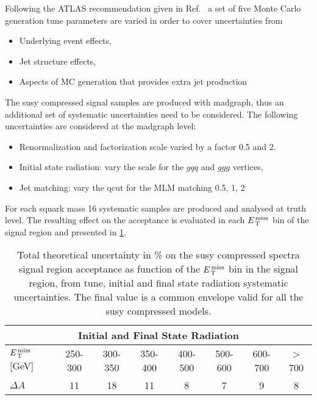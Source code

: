 Following the ATLAS recommendation given in
Ref.~\cite{MCTuningRecommendations2015} a set of five Monte Carlo generation
tune parameters are varied in order to cover uncertainties from
\begin{itemize}
\item Underlying event effects,
\item Jet structure effects,
\item Aspects of MC generation that provides extra jet production
\end{itemize}
The \gls{susy} compressed signal samples are produced with {\sc madgraph}, thus
an additional set of systematic uncertainties need to be considered. The
following uncertainties are considered at the {\sc madgraph} level:
\begin{itemize}
\item Renormalization and factorization scale varied by a factor 0.5 and 2.
\item Initial state radiation: vary the scale for the $gqq$ and $ggg$ vertices,
\item Jet matching: vary the qcut for the MLM matching 0.5, 1, 2
\end{itemize}
For each squark mass 16 systematic samples are produced and analysed at truth
level. The resulting effect on the acceptance is evaluated in each $E_\mathrm{\, T}^\mathrm{\, miss}$ bin
of the signal region and presented in \cref{tab:susy_tune}.
\begin{table}[!h]
  \centering
  \begin{tabular}{lccccccc}
    \toprule
    \multicolumn{8}{c}{Initial and Final State Radiation} \\
    \midrule \midrule
    $E_\mathrm{\, T}^\mathrm{\, miss}$ [GeV] & 250-300 & 300-350  & 350-400 & 400-500 & 500-600 & 600-700
 & > 700 \\
    \midrule
    $\Delta A$ & 11 & 18 & 11 & 8 & 7 & 9 & 8 \\
    \bottomrule
  \end{tabular}
  \caption{Total theoretical uncertainty in \% on the \gls{susy} compressed
    spectra signal region acceptance as function of the $E_\mathrm{\, T}^\mathrm{\, miss}$ bin in the signal
    region, from tune, initial and final state radiation systematic
    uncertainties. The final value is a common envelope valid for all the
    \gls{susy} compressed models.}
  \label{tab:susy_tune}
\end{table}
